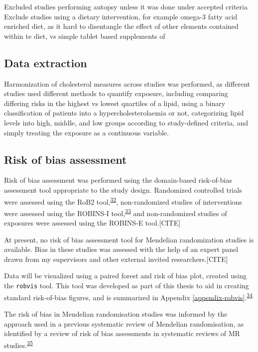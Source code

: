 \documentclass[a4paper, twoside]{templates/ociamthesis}
\begin{document}
Excluded studies performing autopsy unless it was done under accepted criteria Exclude studies using a dietary intervention, for example omega-3 fatty acid enriched diet, as it hard to disentangle the effect of other elements contained within te diet, vs simple tablet based supplements of

\hypertarget{data-extraction}{%
\subsection{Data extraction}\label{data-extraction}}

Harmonization of cholesterol measures across studies was performed, as different studies used different methods to quantify exposure, including comparing differing risks in the highest vs lowest quartiles of a lipid, using a binary classification of patients into a hypercholesterolaemia or not, categorizing lipid levels into high, middle, and low groups according to study-defined criteria, and simply treating the exposure as a continuous variable.

\hypertarget{risk-of-bias-assessment}{%
\subsection{Risk of bias assessment}\label{risk-of-bias-assessment}}

Risk of bias assessment was performed using the domain-based risk-of-bias assessment tool appropriate to the study design. Randomized controlled trials were assessed using the RoB2 tool,\textsuperscript{\protect\hyperlink{ref-sterne2019}{32}}, non-randomized studies of interventions were assessed using the ROBINS-I tool,\textsuperscript{\protect\hyperlink{ref-sterne2016}{33}} and non-randomized studies of exposures were assessed using the ROBINS-E tool.{[}CITE{]}

At present, no risk of bias assessment tool for Mendelian randomization studies is available. Bias in these studies was assessed with the help of an expert panel drawn from my supervisors and other external invited researchers.{[}CITE{]}

Data will be visualized using a paired forest and risk of bias plot, created using the \texttt{robvis} tool. This tool was developed as part of this thesis to aid in creating standard risk-of-bias figures, and is summarized in Appendix \ref{appendix-robvis}.\textsuperscript{\protect\hyperlink{ref-mcguinness2019}{34}}

The risk of bias in Mendelian randomisation studies was informed by the approach used in a previous systematic review of Mendelian randomisation, as identified by a review of risk of bias assessments in systematic reviews of MR studies.\textsuperscript{\protect\hyperlink{ref-mamluk2020}{35}}
\end{document}
